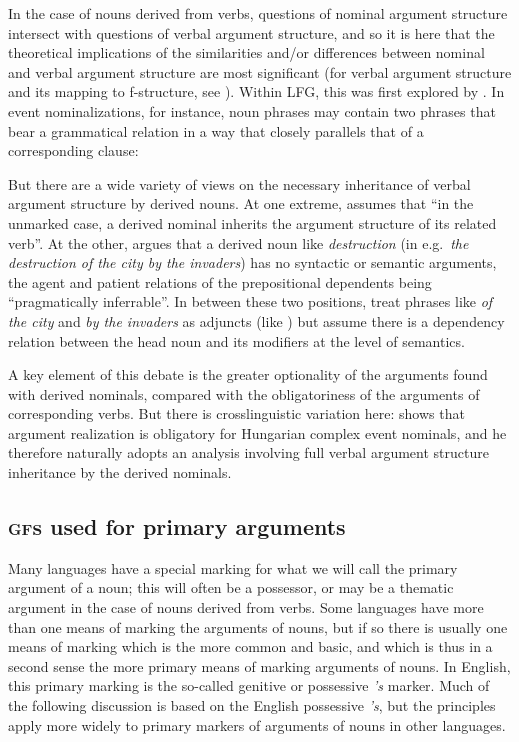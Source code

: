 \documentclass[output=paper,hidelinks]{langscibook}
\begin{document}
In the case of nouns derived from verbs, questions of nominal argument structure intersect with questions of verbal argument structure, and so it is here that the theoretical implications of the similarities and/or differences between nominal and verbal argument structure are most significant (for verbal argument structure and its mapping to f-structure, see ). Within LFG, this was first explored by \citet{Rappaport83}. In event nominalizations, for instance, noun phrases may contain two phrases that bear a grammatical relation in a way that closely parallels that of a corresponding clause:

\newpage
\eal\label{ex:seawater}
\zl


But there are a wide variety of views on the necessary inheritance of verbal argument structure by derived nouns. At one extreme, \citet[135]{Rappaport83} assumes that ``in the unmarked case, a derived nominal inherits the argument structure of its related verb''. At the other, \citet[15]{Lowe17} argues that a derived noun like \emph{destruction} (in e.g.\ \emph{the destruction of the city by the invaders}) has no syntactic or semantic arguments, the agent and patient relations of the prepositional dependents being ``pragmatically inferrable''. In between these two positions, \citet[46]{ButtEtAl1999} treat phrases like \emph{of the city} and \emph{by the invaders} as adjuncts (like \citeauthor{Lowe17}) but assume there is a dependency relation between the head noun and its modifiers at the level of semantics.

A key element of this debate is the greater optionality of the arguments found with derived nominals, compared with the obligatoriness of the arguments of corresponding verbs. But there is crosslinguistic variation here: \citet{Laczko95,Laczko00} shows that argument realization is obligatory for Hungarian complex event nominals, and he therefore naturally adopts an analysis involving full verbal argument structure inheritance by the derived nominals.



\subsection{\textsc{gf}s used for primary arguments}\label{GFprim}

Many languages have a special marking for what we will call the primary argument of a noun; this will often be a possessor, or may be a thematic argument in the case of nouns derived from verbs. Some languages have more than one means of marking the arguments of nouns, but if so there is usually one means of marking which is the more common and basic, and which is thus in a second sense the more primary means of marking arguments of nouns. In English, this primary marking is the so-called genitive or possessive \emph{'s} marker. Much of the following discussion is based on the English possessive \emph{'s}, but the principles apply more widely to primary markers of arguments of nouns in other languages.
\end{document}
